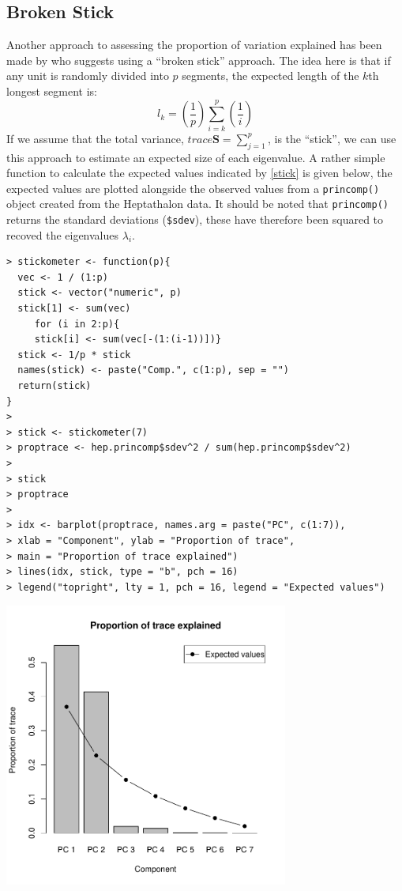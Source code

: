 \subsection{Broken Stick}
\label{brokenstick}

Another approach to assessing the proportion of variation explained has been made by \cite{Jolliffe:1986} who suggests using a ``broken stick'' approach.   The idea here is that if any unit is randomly divided into $p$ segments, the expected length of the $k$th longest segment is:
\begin{equation}
\label{stick}
l_{k} = \left(\frac{1}{p} \right) \sum_{i=k}^{p} \left( \frac{1}{i} \right)
\end{equation}
If we assume that the total variance, $trace{\boldsymbol{S}} = \sum_{j=1}^{p}$, is the ``stick'', we can use this approach to estimate an expected size of each eigenvalue.   A rather simple function to calculate the expected values indicated by \ref{stick} is given below, the expected values are plotted alongside the observed values from a \texttt{princomp()} object created from the Heptathalon data.   It should be noted that \texttt{princomp()} returns the standard deviations (\verb+$sdev+), these have therefore been squared to recoved the eigenvalues $\lambda_{i}$.

\singlespacing
\begin{verbatim}
> stickometer <- function(p){
  vec <- 1 / (1:p)
  stick <- vector("numeric", p) 
  stick[1] <- sum(vec)
     for (i in 2:p){
     stick[i] <- sum(vec[-(1:(i-1))])}
  stick <- 1/p * stick
  names(stick) <- paste("Comp.", c(1:p), sep = "")
  return(stick)
}
> 
> stick <- stickometer(7)
> proptrace <- hep.princomp$sdev^2 / sum(hep.princomp$sdev^2)
>
> stick
> proptrace
> 
> idx <- barplot(proptrace, names.arg = paste("PC", c(1:7)), 
> xlab = "Component", ylab = "Proportion of trace", 
> main = "Proportion of trace explained")
> lines(idx, stick, type = "b", pch = 16)
> legend("topright", lty = 1, pch = 16, legend = "Expected values")
\end{verbatim}
\onehalfspacing

\includegraphics[width = 0.7\textwidth]{images/stick}


